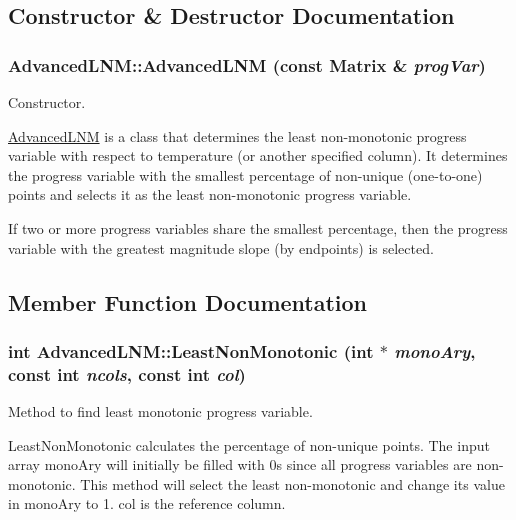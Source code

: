 \subsection{Constructor \& Destructor Documentation}
\hypertarget{classAdvancedLNM_af9317f34be7610889b8d37c606165ec4}{
\subsubsection[{AdvancedLNM}]{\setlength{\rightskip}{0pt plus 5cm}AdvancedLNM::AdvancedLNM (const {\bf Matrix} \& {\em progVar})}}
\label{dd/d1d/classAdvancedLNM_af9317f34be7610889b8d37c606165ec4}


Constructor. 

\hyperlink{classAdvancedLNM}{AdvancedLNM} is a class that determines the least non-\/monotonic progress variable with respect to temperature (or another specified column). It determines the progress variable with the smallest percentage of non-\/unique (one-\/to-\/one) points and selects it as the least non-\/monotonic progress variable.

If two or more progress variables share the smallest percentage, then the progress variable with the greatest magnitude slope (by endpoints) is selected. 

\subsection{Member Function Documentation}
\hypertarget{classAdvancedLNM_aaf028bdf53b6428371d122eb4cf343b4}{
\subsubsection[{LeastNonMonotonic}]{\setlength{\rightskip}{0pt plus 5cm}int AdvancedLNM::LeastNonMonotonic (int $\ast$ {\em monoAry}, \/  const int {\em ncols}, \/  const int {\em col})}}
\label{dd/d1d/classAdvancedLNM_aaf028bdf53b6428371d122eb4cf343b4}


Method to find least monotonic progress variable. 

LeastNonMonotonic calculates the percentage of non-\/unique points. The input array monoAry will initially be filled with 0s since all progress variables are non-\/monotonic. This method will select the least non-\/monotonic and change its value in monoAry to 1. col is the reference column.

